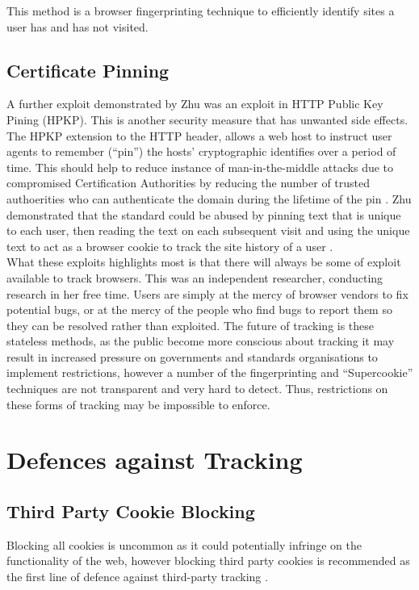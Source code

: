 \documentclass{article}
\begin{document}
This method is a browser fingerprinting technique to efficiently identify sites a user has and has not visited.  \\

\subsection{Certificate Pinning}
A further exploit demonstrated by Zhu was an exploit in HTTP Public Key Pining (HPKP). This is another security measure that has unwanted side effects.  The HPKP extension to the HTTP header, allows a web host to instruct user agents to remember (``pin'') the hosts' cryptographic identifies over a period of time. This should help to reduce instance of man-in-the-middle attacks due to compromised Certification Authorities by reducing the number of trusted authoerities who can authenticate the domain during the lifetime of the pin \parencite{HPKP}. Zhu demonstrated that the standard could be abused by pinning text that is unique to each user, then reading the text on each subsequent visit and using the unique text to act as a browser cookie to track the site history of a user \parencite{newTracking}. \\

What these exploits highlights most is that there will always be some of exploit available to track browsers. This was an independent researcher, conducting research in her free time. Users are simply at the mercy of browser vendors to fix potential bugs, or at the mercy of the people who find bugs to report them so they can be resolved rather than exploited. The future of tracking is these stateless methods, as the public become more conscious about tracking it may result in increased pressure on governments and standards organisations to implement restrictions, however a number of the fingerprinting and ``Supercookie'' techniques are not transparent and very hard to detect. Thus, restrictions on these forms of tracking may be impossible to enforce. 

\section{Defences against Tracking}
\subsection{Third Party Cookie Blocking}
Blocking all cookies is uncommon as it could potentially infringe on the functionality of the web, however blocking third party cookies is recommended as the first line of defence against third-party tracking \parencite{roesner}. 
\end{document}
